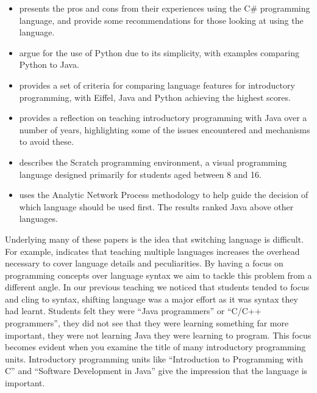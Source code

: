\begin{itemize}
	\item \citet{Bishop:2006} presents the pros and cons from their experiences using the C\# programming language, and provide some recommendations for those looking at using the language.

	\item \citet{Mannila:2006} argue for the use of Python due to its simplicity, with examples comparing Python to Java.

	\item \citet{Mannila:2006a} provides a set of criteria for comparing language features for introductory programming, with Eiffel, Java and Python achieving the highest scores.

	\item \citet{Pendergast:2006} provides a reflection on teaching introductory programming with Java over a number of years, highlighting some of the issues encountered and mechanisms to avoid these.

	\item \citet{Maloney:2010} describes the Scratch programming environment, a visual programming language designed primarily for students aged between 8 and 16.

	\item \citet{Anik:2011} uses the Analytic Network Process methodology to help guide the decision of which language should be used first. The results ranked Java above other languages.
\end{itemize}

Underlying many of these papers is the idea that switching language is difficult. For example, \citet{Brilliant:1996} indicates that teaching multiple languages increases the overhead necessary to cover language details and peculiarities. By having a focus on programming concepts over language syntax we aim to tackle this problem from a different angle. In our previous teaching we noticed that students tended to focus and cling to syntax, shifting language was a major effort as it was syntax they had learnt. Students felt they were ``Java programmers'' or ``C/C++ programmers'', they did not see that they were learning something far more important, they were not learning Java they were learning to program. This focus becomes evident when you examine the title of many introductory programming units. Introductory programming units like ``Introduction to Programming with C'' and ``Software Development in Java'' give the impression that the language is important. 

